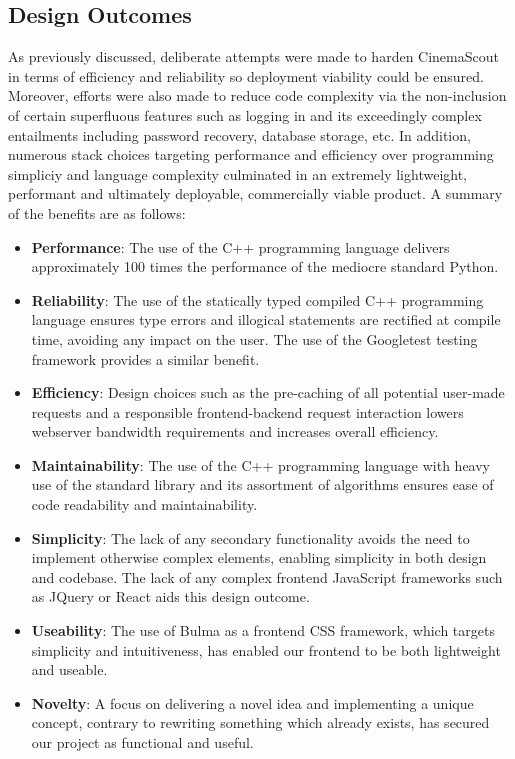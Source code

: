 \documentclass{article}
\begin{document}
\subsection{Design Outcomes}
As previously discussed, deliberate attempts were made to harden CinemaScout
in terms of efficiency and reliability so deployment viability could be ensured.
Moreover, efforts were also made to reduce code complexity via the non-inclusion
of certain superfluous features such as logging in and its exceedingly complex
entailments including password recovery, database storage, etc. In addition, 
numerous stack choices targeting performance and efficiency over programming
simpliciy and language complexity culminated in an extremely lightweight, 
performant and ultimately deployable, commercially viable product. A summary
of the benefits are as follows:
\begin{itemize}
\item \textbf{Performance}: The use of the C++ programming language delivers
approximately 100 times the performance of the mediocre standard Python.
\item \textbf{Reliability}: The use of the statically typed compiled C++
programming language ensures type errors and illogical statements are rectified
at compile time, avoiding any impact on the user. The use of the Googletest
testing framework provides a similar benefit.
\item \textbf{Efficiency}: Design choices such as the pre-caching of all 
potential user-made requests and a responsible frontend-backend request 
interaction lowers webserver bandwidth requirements and increases overall 
efficiency.
\item \textbf{Maintainability}: The use of the C++ programming language with
heavy use of the standard library and its assortment of algorithms ensures ease
of code readability and maintainability.
\item \textbf{Simplicity}: The lack of any secondary functionality avoids 
the need to implement otherwise complex elements, enabling simplicity in 
both design and codebase. The lack of any complex frontend JavaScript frameworks
such as JQuery or React aids this design outcome.
\item \textbf{Useability}: The use of Bulma as a frontend CSS framework, which
targets simplicity and intuitiveness, has enabled our frontend to be both
lightweight and useable.
\item \textbf{Novelty}: A focus on delivering a novel idea and implementing a
unique concept, contrary to rewriting something which already exists, has
secured our project as functional and useful.
\end{itemize}
\end{document}
